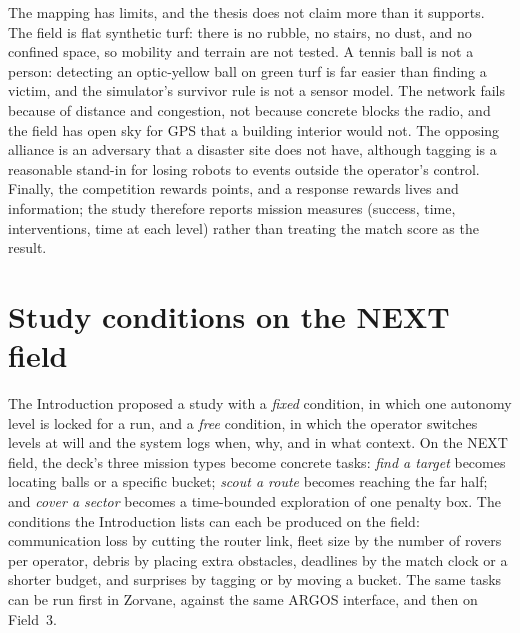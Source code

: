 The mapping has limits, and the thesis does not claim more than it supports.
The field is flat synthetic turf: there is no rubble, no stairs, no dust, and no confined space, so mobility and terrain are not tested.
A tennis ball is not a person: detecting an optic-yellow ball on green turf is far easier than finding a victim, and the simulator's survivor rule is not a sensor model.
The network fails because of distance and congestion, not because concrete blocks the radio, and the field has open sky for GPS that a building interior would not.
The opposing alliance is an adversary that a disaster site does not have, although tagging is a reasonable stand-in for losing robots to events outside the operator's control.
Finally, the competition rewards points, and a response rewards lives and information; the study therefore reports mission measures (success, time, interventions, time at each level) rather than treating the match score as the result.

\section{Study conditions on the NEXT field}
\label{sec:next-study}

The Introduction proposed a study with a \emph{fixed} condition, in which one autonomy level is locked for a run, and a \emph{free} condition, in which the operator switches levels at will and the system logs when, why, and in what context.
On the NEXT field, the deck's three mission types become concrete tasks: \emph{find a target} becomes locating balls or a specific bucket; \emph{scout a route} becomes reaching the far half; and \emph{cover a sector} becomes a time-bounded exploration of one penalty box.
The conditions the Introduction lists can each be produced on the field: communication loss by cutting the router link, fleet size by the number of rovers per operator, debris by placing extra obstacles, deadlines by the match clock or a shorter budget, and surprises by tagging or by moving a bucket.
The same tasks can be run first in Zorvane, against the same ARGOS interface, and then on Field~3.



